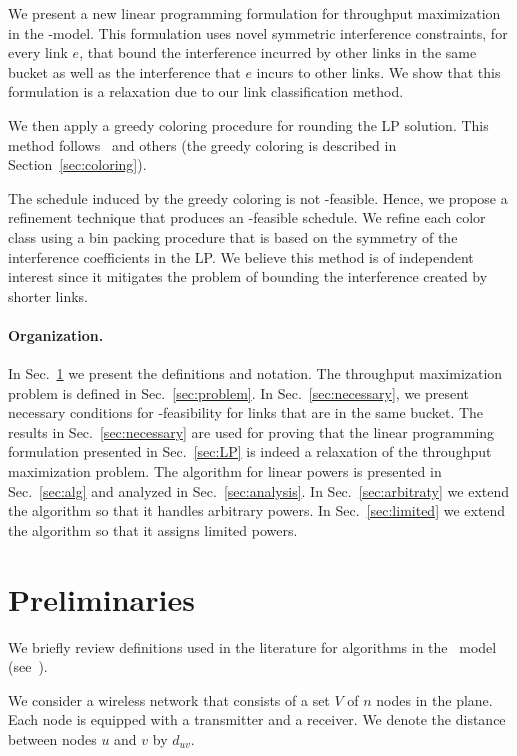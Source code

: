 \documentclass[11pt]{article}
\newenvironment{proof sketch}{\noindent {\bf Proof sketch:} }{\hfill \qed}
\newcommand{\sinr}{\text{\sc{sinr}}}
\begin{document}
We present a new linear programming formulation for throughput
maximization in the \sinr-model.  This
formulation uses novel symmetric interference constraints, for every link $e$, that
bound the interference incurred by other links in the same bucket as well as the
interference that $e$ incurs to other links.
We show that this formulation is a relaxation due to our link classification method.

We then apply a greedy coloring procedure for rounding the LP
solution. This method
follows~\cite{alicherry2005joint,ChafekarCapacity,wan2009multiflows}
and others (the greedy coloring is described in Section~\ref{sec:coloring}).

The schedule induced by the greedy coloring is not \sinr-feasible.
Hence, we propose a refinement technique that produces an \sinr-feasible schedule.
We refine each color class using a bin packing procedure that is based
on the symmetry of the interference coefficients in the LP. We believe
this method is of independent interest since it mitigates the problem
of bounding the interference created by
shorter links.

\paragraph{Organization.}
In Sec.~\ref{sec:prelim} we present the definitions and notation.  The
throughput maximization problem is defined in Sec.~\ref{sec:problem}.
In Sec.~\ref{sec:necessary}, we present necessary conditions for
\sinr-feasibility for links that are in the same bucket.  The results
in Sec.~\ref{sec:necessary} are used for proving that the linear
programming formulation presented in Sec.~\ref{sec:LP} is indeed a
relaxation of the throughput maximization problem.  The algorithm for
linear powers is presented in Sec.~\ref{sec:alg} and analyzed in
Sec.~\ref{sec:analysis}. In Sec.~\ref{sec:arbitraty} we extend the algorithm so that it handles arbitrary powers.
In Sec.~\ref{sec:limited} we extend the algorithm so that it assigns limited powers.

\section{Preliminaries}
\label{sec:prelim}
We briefly review definitions used in the literature for algorithms in
the \sinr\ model (see~\cite{HW,ChafekarCapacity}).

We consider a wireless network that consists of a set $V$ of $n$ nodes in the plane.
Each node is equipped with a transmitter and a receiver.
We denote the distance between nodes $u$ and $v$ by $d_{uv}$.
\end{document}
